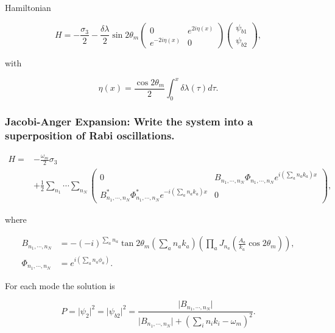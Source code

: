 \documentclass[%
preprint,
 amsmath,amssymb,
 aps,
]{revtex4-1}
\begin{document}
Hamiltonian

\begin{equation}
 H = -\frac{\sigma_3}{2} - \frac{\delta \lambda}{2} \sin 2\theta_m \begin{pmatrix} 0 & e^{2i\eta(x)} \\ e^{-2 i\eta(x) } & 0 \end{pmatrix}  \begin{pmatrix} \psi_{b1} \\ \psi_{b2} \end{pmatrix},
\end{equation}

with

\begin{equation}
 \eta(x) =  \frac{\cos 2\theta_m}{2} \int_0^x \delta\lambda (\tau) d\tau.
\end{equation}


\subsubsection{Jacobi-Anger Expansion: Write the system into a superposition of Rabi oscillations.}
    
    
\begin{align}
H =& -\frac{\omega_m}{2} \sigma_3 \nonumber \\
&+ \frac{1}{2} \sum_{n_1} \cdots \sum_{n_N} \begin{pmatrix} 0 & B_{n_1,\cdots,n_N} \Phi_{n_1,\cdots, n_N} e^{i \left( \sum_{a} n_a k_a   \right)x} \\ B_{n_1,\cdots,n_N}^* \Phi_{n_1,\cdots, n_N}^* e^{-i \left( \sum_{a} n_a k_a   \right)x} & 0 \end{pmatrix},
\end{align}

where

\begin{align}
B_{n_1,\cdots,n_N} &= -(-i)^{\sum_a n_a} \tan 2\theta_m \left( \sum_a n_a k_a \right) \left( \prod_a J_{n_a}\left( \frac{A_a}{k_a}\cos 2\theta_m \right) \right),\\
\Phi_{n_1,\cdots, n_N} &= e^{i\left( \sum_a n_a \phi_a \right)}.
\end{align}


For each mode the solution is

\begin{equation}
P = \lvert \psi_2 \rvert^2 = \lvert \psi_{b2} \rvert^2 = \frac{\lvert B_{n_1,\cdots,n_N} \rvert}{\lvert B_{n_1,\cdots,n_N} \rvert + (\sum_i n_i k_i - \omega_m )^2}.
\end{equation}
\end{document}
